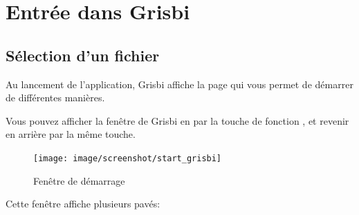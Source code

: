 
\chapter{Entrée dans Grisbi\label{entrance}}

\section{Sélection d'un fichier\label{select-file}}


Au lancement de l'application, Grisbi affiche la page qui vous permet de démarrer de différentes manières.


Vous pouvez afficher la fenêtre de Grisbi en  par la touche de fonction , et revenir en arrière par la même touche.			%


\begin{figure}[htbp]			%
	\begin{center}					%
		\texttt{[image: image/screenshot/start\_grisbi]}		%
	\end{center}
	\caption{Fenêtre de démarrage}			%
	\label{start_grisbi}					%
\end{figure}


Cette fenêtre affiche plusieurs pavés:

